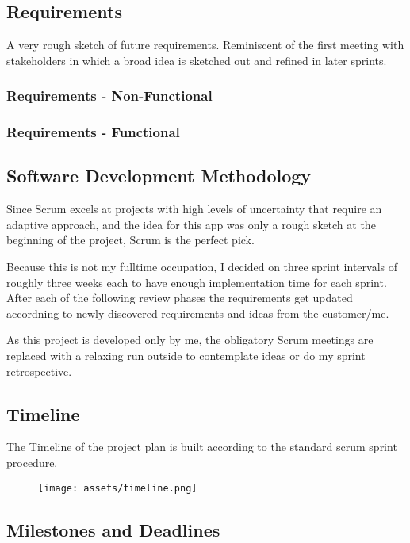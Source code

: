 \newpage
\subsection{Requirements}
A very rough sketch of future requirements. Reminiscent of the first meeting with stakeholders in which a broad idea is sketched out and refined in later sprints.
\subsubsection{Requirements - Non-Functional}


\subsubsection{Requirements - Functional}


\subsection{Software Development Methodology}
Since Scrum excels at projects with high levels of uncertainty that require an adaptive approach, and the idea for this app was only a rough sketch at the beginning of the project, Scrum is the perfect pick.

Because this is not my fulltime occupation, I decided on three sprint intervals of roughly three weeks each to have enough implementation time for each sprint. After each of the following review phases the requirements get updated accordning to newly discovered requirements and ideas from the customer/me.

As this project is developed only by me, the obligatory Scrum meetings are replaced with a relaxing run outside to contemplate ideas or do my sprint retrospective.

\newpage
\subsection{Timeline}
The Timeline of the project plan is built according to the standard scrum sprint procedure.
\begin{figure}[!h]
    \centering
    \texttt{[image: assets/timeline.png]}
    \label{fig:timeline}
\end{figure}

\subsection{Milestones and Deadlines}


